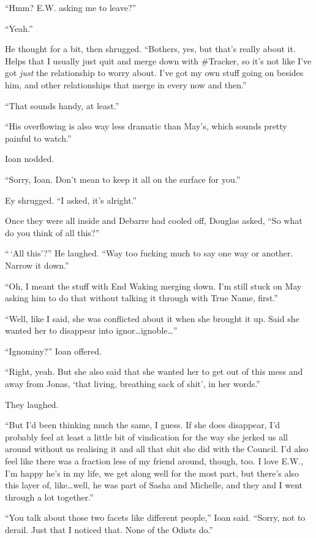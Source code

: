 ``Hmm? E.W. asking me to leave?''

``Yeah.''

He thought for a bit, then shrugged. ``Bothers, yes, but that's really about it. Helps that I usually just quit and merge down with \#Tracker, so it's not like I've got \emph{just} the relationship to worry about. I've got my own stuff going on besides him, and other relationships that merge in every now and then.''

``That sounds handy, at least.''

``His overflowing is also way less dramatic than May's, which sounds pretty painful to watch.''

Ioan nodded.

``Sorry, Ioan. Don't mean to keep it all on the surface for you.''

Ey shrugged. ``I asked, it's alright.''

Once they were all inside and Debarre had cooled off, Douglas asked, ``So what do you think of all this?''

``\,`All this'?'' He laughed. ``Way too fucking much to say one way or another. Narrow it down.''

``Oh, I meant the stuff with End Waking merging down. I'm still stuck on May asking him to do that without talking it through with True Name, first.''

``Well, like I said, she was conflicted about it when she brought it up. Said she wanted her to disappear into ignor\ldots ignoble\ldots{}''

``Ignominy?'' Ioan offered.

``Right, yeah. But she also said that she wanted her to get out of this mess and away from Jonas, `that living, breathing sack of shit', in her words.''

They laughed.

``But I'd been thinking much the same, I guess. If she does disappear, I'd probably feel at least a little bit of vindication for the way she jerked us all around without us realising it and all that shit she did with the Council. I'd also feel like there was a fraction less of my friend around, though, too. I love E.W., I'm happy he's in my life, we get along well for the most part, but there's also this layer of, like\ldots well, he was part of Sasha and Michelle, and they and I went through a lot together.''

``You talk about those two facets like different people,'' Ioan said. ``Sorry, not to derail. Just that I noticed that. None of the Odists do.''

